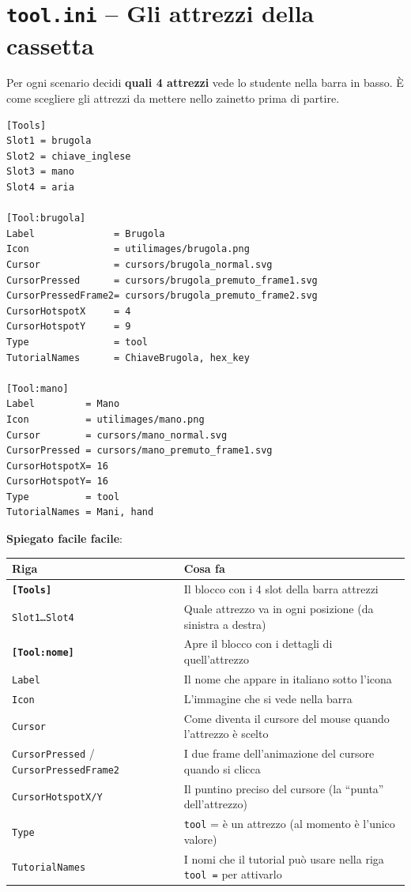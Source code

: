 ﻿\documentclass[a4paper,12pt,oneside]{book}
\newcommand{\kw}[1]{\texttt{\color{keycolor}#1}}
\newcommand{\val}[1]{\texttt{\color{cvtgreen}#1}}
\newcommand{\sez}[1]{\texttt{\color{sectioncolor}\textbf{#1}}}
\begin{document}
\section{\texttt{tool.ini} -- Gli attrezzi della cassetta}

Per ogni scenario decidi \textbf{quali 4 attrezzi} vede lo studente nella barra
in basso. È come scegliere gli attrezzi da mettere nello zainetto prima di
partire.

\begin{esempiocvt}
\begin{lstlisting}
[Tools]
Slot1 = brugola
Slot2 = chiave_inglese
Slot3 = mano
Slot4 = aria

[Tool:brugola]
Label              = Brugola
Icon               = utilimages/brugola.png
Cursor             = cursors/brugola_normal.svg
CursorPressed      = cursors/brugola_premuto_frame1.svg
CursorPressedFrame2= cursors/brugola_premuto_frame2.svg
CursorHotspotX     = 4
CursorHotspotY     = 9
Type               = tool
TutorialNames      = ChiaveBrugola, hex_key

[Tool:mano]
Label         = Mano
Icon          = utilimages/mano.png
Cursor        = cursors/mano_normal.svg
CursorPressed = cursors/mano_premuto_frame1.svg
CursorHotspotX= 16
CursorHotspotY= 16
Type          = tool
TutorialNames = Mani, hand
\end{lstlisting}
\end{esempiocvt}

\textbf{Spiegato facile facile}:

\begin{longtable}{@{}lp{10cm}@{}}
\toprule
\textbf{Riga} & \textbf{Cosa fa} \\
\midrule
\sez{[Tools]} & Il blocco con i 4 slot della barra attrezzi \\
\val{Slot1\ldots Slot4} & Quale attrezzo va in ogni posizione (da sinistra a destra) \\
\sez{[Tool:nome]} & Apre il blocco con i dettagli di quell'attrezzo \\
\val{Label} & Il nome che appare in italiano sotto l'icona \\
\val{Icon} & L'immagine che si vede nella barra \\
\val{Cursor} & Come diventa il cursore del mouse quando l'attrezzo è scelto \\
\val{CursorPressed} / \val{CursorPressedFrame2} & I due frame dell'animazione del cursore quando si clicca \\
\val{CursorHotspotX/Y} & Il puntino preciso del cursore (la ``punta'' dell'attrezzo) \\
\val{Type} & \texttt{tool} = è un attrezzo (al momento è l'unico valore) \\
\val{TutorialNames} & I nomi che il tutorial può usare nella riga \kw{tool =} per attivarlo \\
\bottomrule
\end{longtable}
\end{document}
